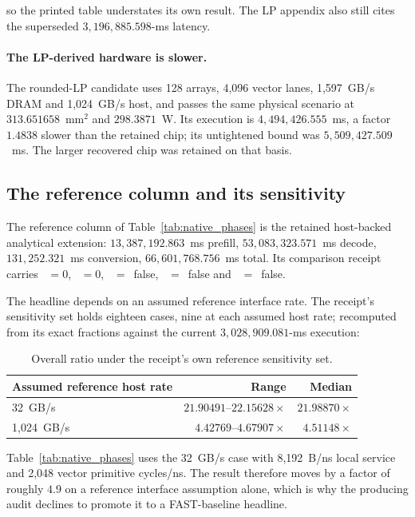 \noindent
so the printed table understates its own result. The LP appendix also still
cites the superseded $3{,}196{,}885.598$-ms latency.

\paragraph{The LP-derived hardware is slower.}
The rounded-LP candidate uses 128 arrays, 4,096 vector lanes, 1,597~GB/s DRAM
and 1,024~GB/s host, and passes the same physical scenario at $313.651658$~mm$^2$
and $298.3871$~W. Its execution is $4{,}494{,}426.555$~ms, a factor $1.4838$
slower than the retained chip; its untightened bound was $5{,}509{,}427.509$~ms.
The larger recovered chip was retained on that basis.

\subsection{The reference column and its sensitivity}
The reference column of Table~\ref{tab:native_phases} is the retained
host-backed analytical extension: $13{,}387{,}192.863$~ms prefill,
$53{,}083{,}323.571$~ms decode, $131{,}252.321$~ms conversion,
$66{,}601{,}768.756$~ms total. Its comparison receipt carries
~$=0$, ~$=0$,
~$=$~false,
~$=$~false and
~$=$~false.

The headline depends on an assumed reference interface rate. The receipt's
sensitivity set holds eighteen cases, nine at each assumed host rate; recomputed
from its exact fractions against the current $3{,}028{,}909.081$-ms execution:

\begin{table}[t]
\centering\small
\caption{Overall ratio under the receipt's own reference sensitivity set.}
\label{tab:table10_sensitivity}
\begin{tabular}{@{}lrr@{}}
\toprule
Assumed reference host rate & Range & Median \\
\midrule
32~GB/s & $21.90491$--$22.15628\times$ & $21.98870\times$ \\
1,024~GB/s & $4.42769$--$4.67907\times$ & $4.51148\times$ \\
\bottomrule
\end{tabular}
\end{table}

\noindent
Table~\ref{tab:native_phases} uses the 32~GB/s case with 8,192~B/ns local
service and 2,048 vector primitive cycles/ns. The result therefore moves by a
factor of roughly $4.9$ on a reference interface assumption alone, which is why
the producing audit declines to promote it to a FAST-baseline headline.

